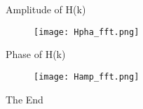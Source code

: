 \documentclass{beamer}
\begin{document}
\begin{frame}{Amplitude of H(k)}
\begin{figure}[h!]
    \centering
    \texttt{[image: Hpha\_fft.png]}
    \label{figs}
\end{figure}
\end{frame}

\begin{frame}{Phase of H(k)}
\begin{figure}[h!]
    \centering
    \texttt{[image: Hamp\_fft.png]}
    \label{figs}
\end{figure}
\end{frame}


\begin{frame}
\Huge{\centerline{The End}}
\end{frame}
\end{document}
